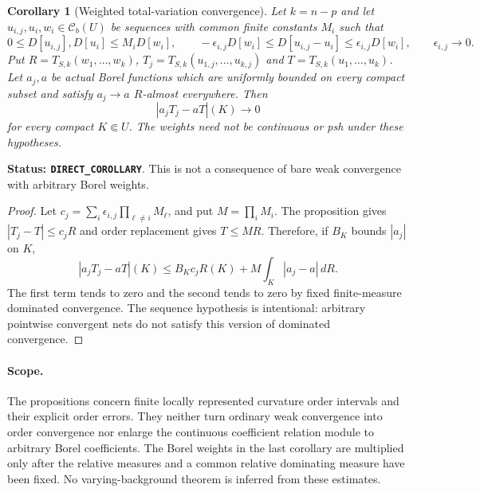 \documentclass[11pt,a4paper]{article}
\numberwithin{equation}{section}
\newtheorem{corollary}[theorem]{Corollary}
\theoremstyle{definition}
\theoremstyle{remark}
\begin{document}
\begin{corollary}[Weighted total-variation convergence]
\label{cor:r6-order-weighted-total-variation}
Let $k=n-p$ and let $u_{i,j},u_i,w_i\in\mathcal C_b(U)$ be
\emph{sequences} with common finite constants $M_i$ such that
\[
 0\le D[u_{i,j}],D[u_i]\le M_iD[w_i],\qquad
 -\epsilon_{i,j}D[w_i]\le D[u_{i,j}-u_i]
                         \le\epsilon_{i,j}D[w_i],
              \qquad \epsilon_{i,j}\longrightarrow0.
\]
Put $R=T_{S,k}(w_1,\ldots,w_k)$, $T_j=T_{S,k}(u_{1,j},\ldots,u_{k,j})$
and $T=T_{S,k}(u_1,\ldots,u_k)$. Let $a_j,a$ be actual Borel
functions which are uniformly bounded on every compact subset and
satisfy $a_j\to a$ $R$-almost everywhere. Then
\[
                         |a_jT_j-aT|(K)\longrightarrow0
\]
for every compact $K\Subset U$.
The weights need not be continuous or psh under these hypotheses.
\end{corollary}

\noindent\textbf{Status: \texttt{DIRECT\_COROLLARY}}. This is
not a consequence of bare weak convergence with arbitrary Borel weights.

\begin{proof}
Let $c_j=\sum_i\epsilon_{i,j}\prod_{\ell\ne i}M_\ell$, and put
$M=\prod_iM_i$. The proposition gives $|T_j-T|\le c_jR$ and
order replacement gives $T\le MR$. Therefore, if $B_K$ bounds
$|a_j|$ on $K$,
\[
 |a_jT_j-aT|(K)
  \le B_Kc_jR(K)+M\int_K|a_j-a|\,dR.
\]
The first term tends to zero and the second tends to zero by fixed
finite-measure dominated convergence. The sequence hypothesis is
intentional: arbitrary pointwise convergent nets do not satisfy this
version of dominated convergence.
\end{proof}

\paragraph{Scope.}
The propositions concern finite locally represented curvature order
intervals and their explicit order errors. They neither turn ordinary
weak convergence into order convergence nor enlarge the continuous
coefficient relation module to arbitrary Borel coefficients. The Borel
weights in the last corollary are multiplied only after the relative
measures and a common relative dominating measure have been fixed.
No varying-background theorem is inferred from these estimates.



\end{document}
